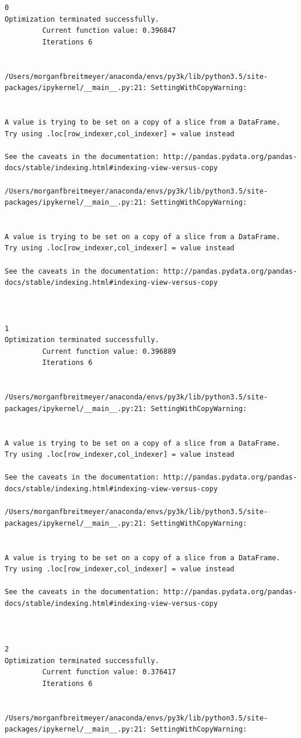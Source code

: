 \begin{lstlisting}
0
Optimization terminated successfully.
         Current function value: 0.396847
         Iterations 6


/Users/morganfbreitmeyer/anaconda/envs/py3k/lib/python3.5/site-packages/ipykernel/__main__.py:21: SettingWithCopyWarning:


A value is trying to be set on a copy of a slice from a DataFrame.
Try using .loc[row_indexer,col_indexer] = value instead

See the caveats in the documentation: http://pandas.pydata.org/pandas-docs/stable/indexing.html#indexing-view-versus-copy

/Users/morganfbreitmeyer/anaconda/envs/py3k/lib/python3.5/site-packages/ipykernel/__main__.py:21: SettingWithCopyWarning:


A value is trying to be set on a copy of a slice from a DataFrame.
Try using .loc[row_indexer,col_indexer] = value instead

See the caveats in the documentation: http://pandas.pydata.org/pandas-docs/stable/indexing.html#indexing-view-versus-copy



1
Optimization terminated successfully.
         Current function value: 0.396889
         Iterations 6


/Users/morganfbreitmeyer/anaconda/envs/py3k/lib/python3.5/site-packages/ipykernel/__main__.py:21: SettingWithCopyWarning:


A value is trying to be set on a copy of a slice from a DataFrame.
Try using .loc[row_indexer,col_indexer] = value instead

See the caveats in the documentation: http://pandas.pydata.org/pandas-docs/stable/indexing.html#indexing-view-versus-copy

/Users/morganfbreitmeyer/anaconda/envs/py3k/lib/python3.5/site-packages/ipykernel/__main__.py:21: SettingWithCopyWarning:


A value is trying to be set on a copy of a slice from a DataFrame.
Try using .loc[row_indexer,col_indexer] = value instead

See the caveats in the documentation: http://pandas.pydata.org/pandas-docs/stable/indexing.html#indexing-view-versus-copy



2
Optimization terminated successfully.
         Current function value: 0.376417
         Iterations 6


/Users/morganfbreitmeyer/anaconda/envs/py3k/lib/python3.5/site-packages/ipykernel/__main__.py:21: SettingWithCopyWarning:



\end{lstlisting}
